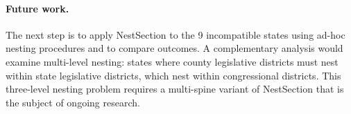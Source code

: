 \paragraph{Future work.}
The next step is to apply NestSection to the 9 incompatible states using
ad-hoc nesting procedures and to compare outcomes. A complementary analysis
would examine multi-level nesting: states where county legislative districts
must nest within state legislative districts, which nest within congressional
districts. This three-level nesting problem requires a multi-spine variant of
NestSection that is the subject of ongoing research.
